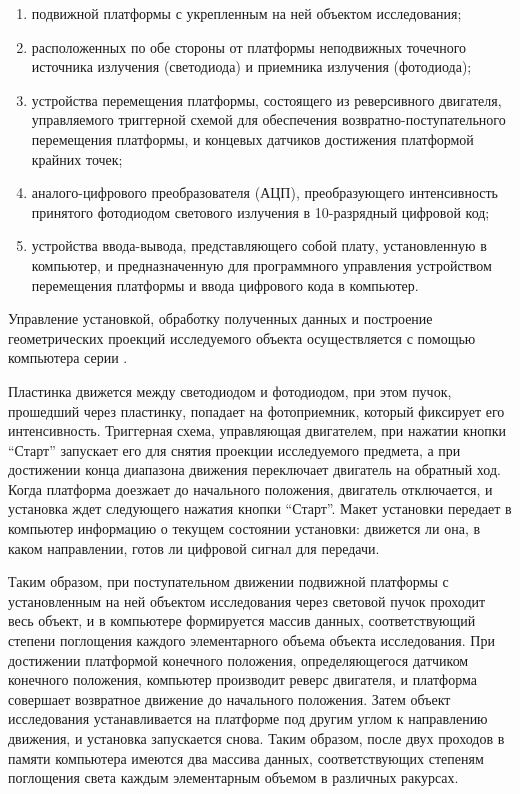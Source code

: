 \begin{enumerate}
\item подвижной платформы с укрепленным на ней объектом исследования;
\item расположенных по обе стороны от платформы неподвижных точечного источника излучения (светодиода) и приемника излучения (фотодиода);
\item устройства перемещения платформы, состоящего из реверсивного двигателя, управляемого триггерной схемой для обеспечения возвратно-поступательного перемещения платформы, и концевых датчиков достижения платформой крайних точек;
\item аналого-цифрового преобразователя (АЦП), преобразующего интенсивность принятого фотодиодом светового излучения в 10-разрядный цифровой код;
\item устройства ввода-вывода, представляющего собой плату, установленную в компьютер, и предназначенную для программного управления устройством перемещения платформы и ввода цифрового кода в компьютер.
\end{enumerate}

Управление установкой, обработку полученных данных и построение геометрических проекций исследуемого объекта осуществляется с помощью компьютера серии .

Пластинка движется между светодиодом и фотодиодом, при этом пучок, прошедший через пластинку, попадает на фотоприемник, который фиксирует его интенсивность. Триггерная схема, управляющая двигателем, при нажатии кнопки \enquote{Старт} запускает его для снятия проекции исследуемого предмета, а при достижении конца диапазона движения переключает двигатель на обратный ход. Когда платформа доезжает до начального положения, двигатель отключается, и установка ждет следующего нажатия кнопки \enquote{Старт}. Макет установки передает в компьютер информацию о текущем состоянии установки: движется ли она, в каком направлении, готов ли цифровой сигнал для передачи.

Таким образом, при поступательном движении подвижной платформы с установленным на ней объектом исследования через световой пучок проходит весь объект, и в компьютере формируется массив данных, соответствующий степени поглощения каждого элементарного объема объекта исследования. При достижении платформой конечного положения, определяющегося датчиком конечного положения, компьютер производит реверс двигателя, и платформа совершает возвратное движение до начального положения. Затем объект исследования устанавливается на платформе под другим углом к направлению движения, и установка запускается снова. Таким образом, после двух проходов в памяти компьютера имеются два массива данных, соответствующих степеням поглощения света каждым элементарным объемом в различных ракурсах.

